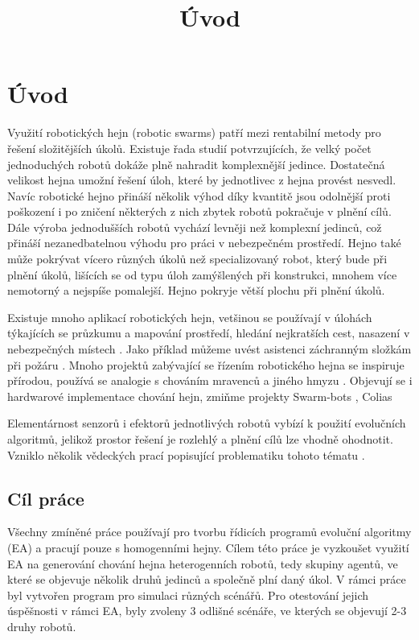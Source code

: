 \chapter*{Úvod}

\title{Úvod}
Využití robotických hejn (robotic swarms) patří mezi rentabilní metody pro řešení složitějších úkolů. Existuje řada studií potvrzujících, že velký počet jednoduchých robotů dokáže plně nahradit komplexnější jedince. Dostatečná velikost hejna umožní řešení úloh, které by jednotlivec z hejna provést nesvedl. Navíc robotické hejno přináší několik výhod díky kvantitě jsou odolnější proti poškození i po zničení některých z nich zbytek robotů pokračuje v plnění cílů. Dále výroba jednodušších robotů vychází levněji než komplexní jedinců, což přináší nezanedbatelnou výhodu pro práci v nebezpečném prostředí. Hejno také může pokrývat vícero různých úkolů než specializovaný robot, který bude při plnění úkolů, lišících se od typu úloh zamýšlených při konstrukci, mnohem více nemotorný a nejspíše pomalejší. Hejno pokryje větší plochu při plnění úkolů. 
\par
Existuje mnoho aplikací robotických hejn, vetšinou se používají v úlohách týkajících se průzkumu a mapování prostředí, hledání nejkratších cest, nasazení v nebezpečných místech \citep{swarmApp}. Jako příklad můžeme uvést asistenci záchranným složkám při požáru \citep{fireRobots}. Mnoho projektů zabývající se řízením robotického hejna se inspiruje přírodou, používá se analogie s chováním mravenců a jiného hmyzu \citep{PheroRobot}. Objevují se i hardwarové implementace chování hejn, zmiňme projekty Swarm-bots \citep{swarmBots}, Colias \citep{Colias}  
\par 
Elementárnost senzorů i efektorů jednotlivých robotů vybízí k použití evolučních algoritmů, jelikož prostor řešení je rozlehlý a plnění cílů lze vhodně ohodnotit. Vzniklo několik vědeckých prací popisující problematiku tohoto tématu \citep{ENovel} \citep{geneticSwarm}.
\section*{Cíl práce}
Všechny zmíněné práce používají pro tvorbu řídicích programů evoluční algoritmy (EA) a pracují pouze s homogenními hejny. Cílem této práce je vyzkoušet využití EA na generování chování hejna heterogenních robotů, tedy skupiny agentů, ve které se objevuje několik druhů jedinců a společně plní daný úkol. V rámci práce byl vytvořen program pro simulaci různých scénářů. Pro otestování jejich úspěšnosti v rámci EA, byly zvoleny 3 odlišné scénáře, ve kterých se objevují 2-3 druhy robotů.
